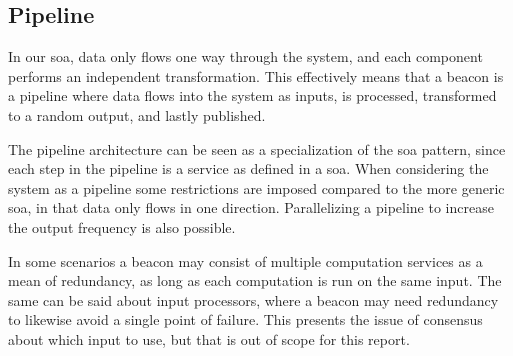 \subsection{Pipeline}%
\label{sub:pipeline}
In our \gls{soa}, data only flows one way through the system, and each component performs an independent transformation.
This effectively means that a beacon is a pipeline where data flows into the system as inputs, is processed, transformed to a random output, and lastly published.

The pipeline architecture can be seen as a specialization of the \gls{soa} pattern, since each step in the pipeline is a service as defined in a \gls{soa}.
When considering the system as a pipeline some restrictions are imposed compared to the more generic \gls{soa}, in that data only flows in one direction.
Parallelizing a pipeline to increase the output frequency is also possible.

In some scenarios a beacon may consist of multiple computation services as a mean of redundancy, as long as each computation is run on the same input.
The same can be said about input processors, where a beacon may need redundancy to likewise avoid a single point of failure.
This presents the issue of consensus about which input to use, but that is out of scope for this report.

